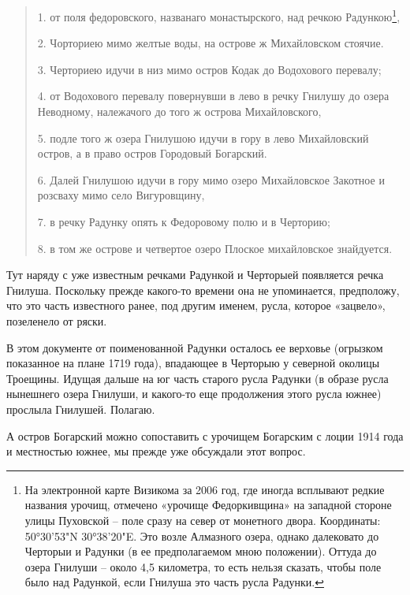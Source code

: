 \begin{quotation}
1. от поля федоровского, названаго монастырского, над речкою Радункою\footnote{На электронной карте Визикома за 2006 год, где иногда всплывают редкие названия урочищ, отмечено «урочище Федоркивщина» на западной стороне улицы Пуховской – поле сразу на север от монетного двора. Координаты: 50°30'53"N 30°38'20"E. Это возле Алмазного озера, однако далековато до Черторыи и Радунки (в ее предполагаемом мною положении). Оттуда до озера Гнилуши – около 4,5 километра, то есть нельзя сказать, чтобы поле было над Радункой, если Гнилуша это часть русла Радунки.},

2. Чорториею мимо желтые воды, на острове ж Михайловском стоячие. 

3. Черториею идучи в низ мимо остров Кодак до Водохового перевалу; 

4. от Водохового перевалу повернувши в лево в речку Гнилушу до озера Неводному, належачого до того ж острова Михайловского, 

5. подле того ж озера Гнилушою идучи в гору в лево Михайловский остров, а в право остров Городовый Богарский.

6. Далей Гнилушою идучи в гору мимо озеро Михайловское Закотное и розсваху мимо село Вигуровщину,

7. в речку Радунку опять к Федоровому полю и в Черторию;

8. в том же острове и четвертое озеро Плоское михайловское знайдуется.
\end{quotation}

Тут наряду с уже известным речками Радункой и Черторыей появляется речка Гнилуша. Поскольку прежде какого-то времени она не упоминается, предположу, что это часть известного ранее, под другим именем, русла, которое «зацвело», позеленело от ряски.


В этом документе от поименованной Радунки осталось ее верховье (огрызком показанное на плане 1719 года), впадающее в Черторыю у северной околицы Троещины. Идущая дальше на юг часть старого русла Радунки (в образе русла нынешнего озера Гнилуши, и какого-то еще продолжения этого русла южнее) прослыла Гнилушей. Полагаю.

А остров Богарский можно сопоставить с урочищем Богарским с лоции 1914 года и местностью южнее, мы прежде уже обсуждали этот вопрос.

